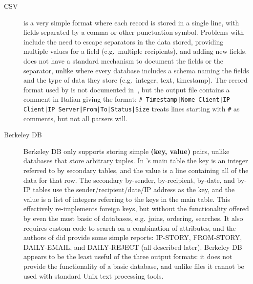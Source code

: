 \begin{description}

    \item [CSV]  is a very simple format where each record is
        stored in a single line, with fields separated by a comma or other
        punctuation symbol.  Problems with  include the need
        to escape separators in the data stored, providing multiple values
        for a field (e.g.\ multiple recipients), and adding new fields.
         does not have a standard mechanism to document the
        fields or the separator, unlike  where every database
        includes a schema naming the fields and the type of data they store
        (e.g.\ integer, text, timestamp).  The  record format
        used by  is not documented
        in~\cite{log-mail-analyser}, but the output file contains a comment
        in Italian giving the format:\newline{} \tab{} \texttt{\#
        Timestamp|Nome Client|IP Client|IP
        Server|From|To\newline{}\tab{}\tab{}|Status|Size}
        \newline{} treats  lines starting with
        \texttt{\#} as comments, but not all  parsers will.

    \item [Berkeley DB] Berkeley DB only supports storing simple
        \textbf{(key, value)} pairs, unlike  databases that
        store arbitrary tuples.  In 's main table the key is
        an integer referred to by secondary tables, and the value is a
         line containing all of the data for that row.  The
        secondary by-sender, by-recipient, by-date, and by-IP tables use
        the sender/recipient/date/IP address as the key, and the value is a
         list of integers referring to the keys in the main
        table.  This effectively re-implements  foreign keys,
        but without the functionality offered by even the most basic of
         databases, e.g.\ joins, ordering, searches.  It also
        requires custom code to search on a combination of attributes, and
        the authors of  did provide some simple reports:
        IP-STORY, FROM-STORY, DAILY-EMAIL, and DAILY-REJECT (all described
        later).  Berkeley DB appears to be the least useful of the three
        output formats: it does not provide the functionality of a basic
         database, and unlike  files it cannot be
        used with standard Unix text processing tools.


\end{description}

